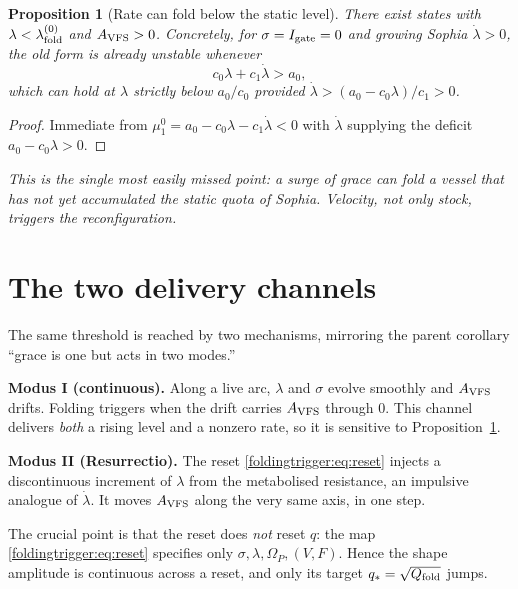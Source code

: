 \documentclass[11pt,a4paper,oneside]{book}
\newcommand{\Op}{\Omega_P}
\newcommand{\Igate}{I_{\rm gate}}
\newcommand{\note}[1]{\textcolor{black!65}{\emph{#1}}}
\newcommand{\Avfs}{A_{\rm VFS}}
\newcommand{\Qf}{Q_{\rm fold}}
\theoremstyle{plain}
\newtheorem{proposition}{Proposition}[chapter]
\theoremstyle{definition}
\theoremstyle{remark}
\begin{document}
\begin{proposition}[Rate can fold below the static level]\label{foldingtrigger:prop:rate}
There exist states with $\lambda<\lambda_{\rm fold}^{(0)}$ and $\Avfs>0$. Concretely, for $\sigma=\Igate=0$
and growing Sophia $\dot\lambda>0$, the old form is already unstable whenever
\begin{equation}
c_0\lambda+c_1\dot\lambda>a_0,
\end{equation}
which can hold at $\lambda$ strictly below $a_0/c_0$ provided $\dot\lambda>(a_0-c_0\lambda)/c_1>0$.
\end{proposition}
\begin{proof}
Immediate from $\mu_1^{0}=a_0-c_0\lambda-c_1\dot\lambda<0$ with $\dot\lambda$ supplying the deficit
$a_0-c_0\lambda>0$.
\end{proof}

\note{This is the single most easily missed point: a surge of grace can fold a vessel that has not yet
accumulated the static quota of Sophia. Velocity, not only stock, triggers the reconfiguration.}

\section{The two delivery channels}\label{foldingtrigger:sec:channels}

The same threshold is reached by two mechanisms, mirroring the parent corollary ``grace is one but acts
in two modes.''

\medskip
\noindent\textbf{Modus I (continuous).} Along a live arc, $\lambda$ and $\sigma$ evolve smoothly and
$\Avfs$ drifts. Folding triggers when the drift carries $\Avfs$ through $0$. This channel delivers
\emph{both} a rising level and a nonzero rate, so it is sensitive to Proposition~\ref{foldingtrigger:prop:rate}.

\medskip
\noindent\textbf{Modus II (Resurrectio).} The reset \eqref{foldingtrigger:eq:reset} injects a discontinuous increment of
$\lambda$ from the metabolised resistance, an impulsive analogue of $\dot\lambda$. It moves $\Avfs$ along
the very same axis, in one step.

The crucial point is that the reset does \emph{not} reset $q$: the map \eqref{foldingtrigger:eq:reset} specifies only
$\sigma,\lambda,\Op,(V,F)$. Hence the shape amplitude is continuous across a reset, and only its target
$q_\ast=\sqrt{\Qf}$ jumps.
\end{document}
